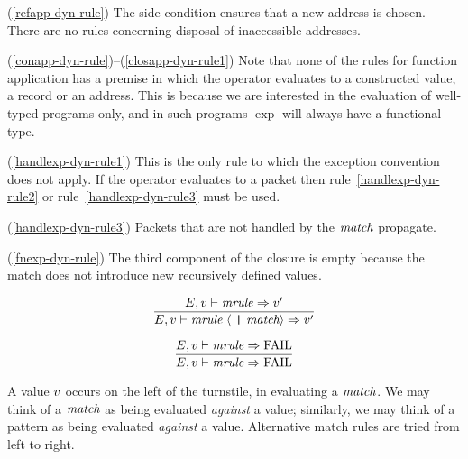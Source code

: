 \pagebreak
\noindent\comments
\begin{description}
\item{(\ref{refapp-dyn-rule})}
  The side condition ensures that a new address is chosen. There are
no rules concerning disposal of inaccessible addresses.
%
\item{(\ref{conapp-dyn-rule})--(\ref{closapp-dyn-rule1})}
  Note that none of the rules for function application has a
premise in which the operator evaluates to a constructed
value, a record or an address. This is because we are interested
in the evaluation of well-typed programs only, and in such programs $\exp$
will always have a functional type.
%
\item{(\ref{handlexp-dyn-rule1})}
  This is the only rule to which the exception convention does not apply.
If the operator evaluates to a packet then rule~\ref{handlexp-dyn-rule2}
or rule~\ref{handlexp-dyn-rule3} must be used.
%
\item{(\ref{handlexp-dyn-rule3})}
 Packets that are not handled by the ${\it match}$ propagate.
%
\item{(\ref{fnexp-dyn-rule})}
  The third component of the  closure is empty because the match does not
introduce new recursively defined values.
\end{description}
%
%
\begin{equation}	%
\frac{\E,\V\ts\mrule\ra\V'}
     {\E,\V\ts\longmatch\ra\V'}\index{54.1}
\end{equation}

\begin{equation}	%
\frac{\E,\V\ts\mrule\ra\FAIL}
     {\E,\V\ts\mrule\ra\FAIL}
\end{equation}

\comment A value $v$ occurs on the left of the turnstile, in evaluating
a ${\it match}$. We may think of a ${\it match}$ as being evaluated {\sl against}
a value; similarly, we may think of a pattern as being evaluated {\sl
against} a value.
Alternative match rules are tried from left to right.

